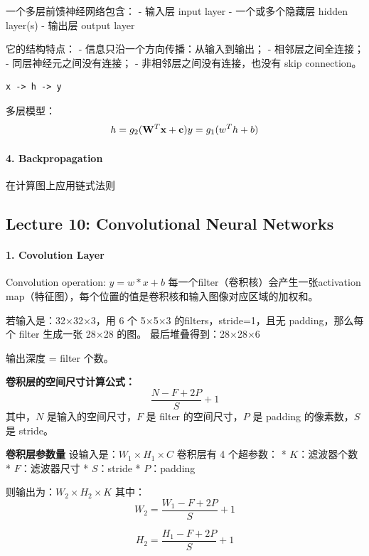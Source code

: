 \documentclass[
]{ctexart}
\begin{document}
一个多层前馈神经网络包含： - 输入层 input layer - 一个或多个隐藏层
hidden layer(s) - 输出层 output layer

它的结构特点： - 信息只沿一个方向传播：从输入到输出； -
相邻层之间全连接； - 同层神经元之间没有连接； -
非相邻层之间没有连接，也没有 skip connection。

\begin{verbatim}
x -> h -> y
\end{verbatim}

多层模型： \[h = g_2(\mathbf{W}^T \mathbf{x} + \mathbf{c}) \\
y = g_1(w^T h + b)\]

\paragraph{4. Backpropagation}\label{backpropagation}

在计算图上应用链式法则


\clearpage

\subsection{Lecture 10: Convolutional Neural
Networks}\label{lecture-10-convolutional-neural-networks}

\paragraph{1. Covolution Layer}\label{covolution-layer}

Convolution operation: \(y = w * x + b\)
每一个filter（卷积核）会产生一张activation
map（特征图），每个位置的值是卷积核和输入图像对应区域的加权和。

若输入是：32×32×3，用 6 个 5×5×3 的filters，stride=1，且无
padding，那么每个 filter 生成一张 28×28 的图。 最后堆叠得到：28×28×6

输出深度 = filter 个数。

\textbf{卷积层的空间尺寸计算公式：} \[\frac{N - F + 2P}{S} + 1\]
其中，\(N\) 是输入的空间尺寸，\(F\) 是 filter 的空间尺寸，\(P\) 是
padding 的像素数，\(S\) 是 stride。

\textbf{卷积层参数量} 设输入是：\(W_1 \times H_1 \times C\) 卷积层有 4
个超参数： * \(K\)：滤波器个数 * \(F\)：滤波器尺寸 * \(S\)：stride *
\(P\)：padding

则输出为：\(W_2 \times H_2 \times K\) 其中： \[
W_2 = \frac{W_1 - F + 2P}{S} + 1
\]

\[
H_2 = \frac{H_1 - F + 2P}{S} + 1
\]
\end{document}
